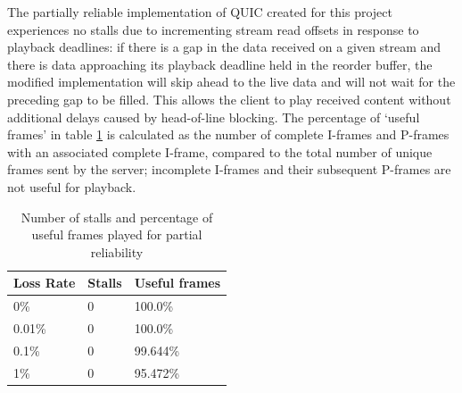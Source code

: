 \documentclass{mpaper}
\begin{document}



The partially reliable implementation of QUIC created for this project experiences no stalls due to incrementing stream read offsets in response to playback deadlines: if there is a gap in the data received on a given stream and there is data approaching its playback deadline held in the reorder buffer, the modified implementation will skip ahead to the live data and will not wait for the preceding gap to be filled. This allows the client to play received content without additional delays caused by head-of-line blocking. The percentage of `useful frames' in table \ref{par-playback-stats} is calculated as the number of complete I-frames and P-frames with an associated complete I-frame, compared to the total number of unique frames sent by the server; incomplete I-frames and their subsequent P-frames are not useful for playback.

\begin{table}[h!]
\centering
\label{stalls-data-par}
\begin{center}
\begin{tabular}{|p{2cm}|p{2cm}|p{2cm}|}
\hline
Loss Rate & Stalls & Useful frames\\ \hline
0\% & 0 & 100.0\% \\ \hline
0.01\%  & 0 & 100.0\% \\ \hline
0.1\%  & 0 & 99.644\% \\ \hline
1\%  & 0 & 95.472\% \\ \hline

\end{tabular}
\caption{Number of stalls and percentage of useful frames played for partial reliability}
\label{par-playback-stats}
\end{center}
\end{table}
\end{document}
